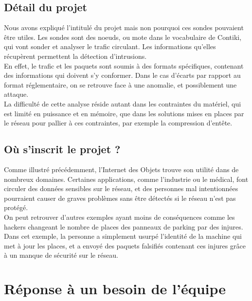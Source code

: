 	\subsection{Détail du projet}
		Nous avons expliqué l'intitulé du projet mais non pourquoi ces sondes pouvaient être utiles. Les sondes sont des noeuds, ou mote dans le vocabulaire de Contiki, qui vont sonder et analyser le trafic circulant. Les informations qu'elles récupèrent permettent la détection d'intrusions. \\
		En effet, le trafic et les paquets sont soumis à des formats spécifiques, contenant des informations qui doivent s'y conformer. Dans le cas d'écarts par rapport au format réglementaire, on se retrouve face à une anomalie, et possiblement une attaque.\\
		La difficulté de cette analyse réside autant dans les contraintes du matériel, qui est limité en puissance et en mémoire, que dans les solutions mises en places par le réseau pour pallier à ces contraintes, par exemple la compression d'entête.
	\subsection{Où s'inscrit le projet ?}
		Comme illustré précédemment, l'Internet des Objets trouve son utilité dans de nombreux domaines. Certaines applications, comme l'industrie ou le médical, font circuler des données sensibles sur le réseau, et des personnes mal intentionnées pourraient causer de graves problèmes sans être détectés si le réseau n'est pas protégé.\\
		On peut retrouver d'autres exemples ayant moins de conséquences comme les hackers changeant le nombre de places des panneaux de parking par des injures. Dans cet exemple, la personne a simplement usurpé l'identité de la machine qui met à jour les places, et a envoyé des paquets falsifiés contenant ces injures grâce à un manque de sécurité sur le réseau.

\section{Réponse à un besoin de l'équipe}
	
